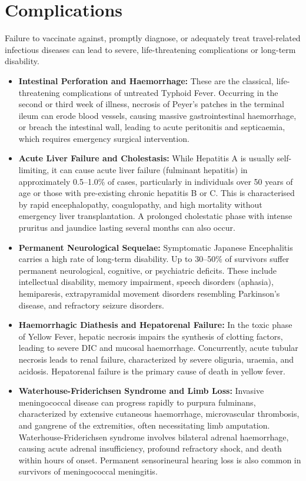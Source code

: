 \section*{Complications}
Failure to vaccinate against, promptly diagnose, or adequately treat travel-related infectious diseases can lead to severe, life-threatening complications or long-term disability.
\begin{itemize}
    \item \textbf{Intestinal Perforation and Haemorrhage:} These are the classical, life-threatening complications of untreated Typhoid Fever. Occurring in the second or third week of illness, necrosis of Peyer's patches in the terminal ileum can erode blood vessels, causing massive gastrointestinal haemorrhage, or breach the intestinal wall, leading to acute peritonitis and septicaemia, which requires emergency surgical intervention.
    \item \textbf{Acute Liver Failure and Cholestasis:} While Hepatitis A is usually self-limiting, it can cause acute liver failure (fulminant hepatitis) in approximately 0.5--1.0\% of cases, particularly in individuals over 50 years of age or those with pre-existing chronic hepatitis B or C. This is characterised by rapid encephalopathy, coagulopathy, and high mortality without emergency liver transplantation. A prolonged cholestatic phase with intense pruritus and jaundice lasting several months can also occur.
    \item \textbf{Permanent Neurological Sequelae:} Symptomatic Japanese Encephalitis carries a high rate of long-term disability. Up to 30--50\% of survivors suffer permanent neurological, cognitive, or psychiatric deficits. These include intellectual disability, memory impairment, speech disorders (aphasia), hemiparesis, extrapyramidal movement disorders resembling Parkinson's disease, and refractory seizure disorders.
    \item \textbf{Haemorrhagic Diathesis and Hepatorenal Failure:} In the toxic phase of Yellow Fever, hepatic necrosis impairs the synthesis of clotting factors, leading to severe DIC and mucosal haemorrhage. Concurrently, acute tubular necrosis leads to renal failure, characterized by severe oliguria, uraemia, and acidosis. Hepatorenal failure is the primary cause of death in yellow fever.
    \item \textbf{Waterhouse-Friderichsen Syndrome and Limb Loss:} Invasive meningococcal disease can progress rapidly to purpura fulminans, characterized by extensive cutaneous haemorrhage, microvascular thrombosis, and gangrene of the extremities, often necessitating limb amputation. Waterhouse-Friderichsen syndrome involves bilateral adrenal haemorrhage, causing acute adrenal insufficiency, profound refractory shock, and death within hours of onset. Permanent sensorineural hearing loss is also common in survivors of meningococcal meningitis.

\end{itemize}
